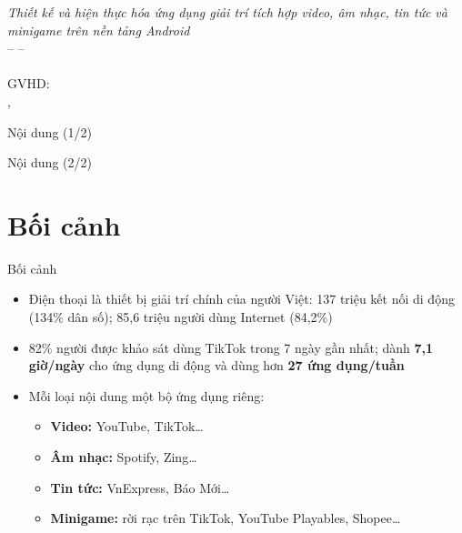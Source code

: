 \documentclass[aspectratio=169]{beamer}
\title{\reporttitle}
\subtitle{\coursecode{} -- \coursename{} \\ \reportkind}
\author{\reportauthor}
\institute{GVHD: \reportadvisors}
\date{\reportplace{} -- \reportyear}
\begin{document}
\begin{frame}[plain]
  \vspace{12mm}
  \begin{center}
    {\color{brandmint}\LARGE\itshape Thiết kế và hiện thực hóa ứng dụng giải trí tích hợp video, âm nhạc, tin tức và minigame trên nền tảng Android}\\[6mm]
    {\color{white}\large \coursecode{} -- \coursename{} -- \reportkind}\\[6mm]
    {\color{white}\large \reportauthor}\\[2mm]
    {\color{white}\normalsize GVHD: \reportadvisors}\\[4mm]
    {\color{white}\normalsize \reportplace{}, \reportyear}
  \end{center}
\end{frame}

\begin{frame}{Nội dung (1/2)}
  \tableofcontents[sections={1-13}]
\end{frame}

\begin{frame}{Nội dung (2/2)}
  \tableofcontents[sections={14-26}]
\end{frame}

\section{Bối cảnh}
\begin{frame}{Bối cảnh}
  \begin{itemize}
    \item Điện thoại là thiết bị giải trí chính của người Việt:
          137 triệu kết nối di động (134\% dân số); 85,6 triệu người dùng Internet (84,2\%)
    \item 82\% người được khảo sát dùng TikTok trong 7 ngày gần nhất;
          dành \textbf{7,1 giờ/ngày} cho ứng dụng di động và dùng hơn \textbf{27 ứng dụng/tuần}
    \item Mỗi loại nội dung một bộ ứng dụng riêng:
      \begin{itemize}\small
        \item \textbf{Video:} YouTube, TikTok\ldots
        \item \textbf{Âm nhạc:} Spotify, Zing\ldots
        \item \textbf{Tin tức:} VnExpress, Báo Mới\ldots
        \item \textbf{Minigame:} rời rạc trên TikTok, YouTube Playables, Shopee\ldots
      \end{itemize}
  \end{itemize}
\end{frame}
\end{document}
